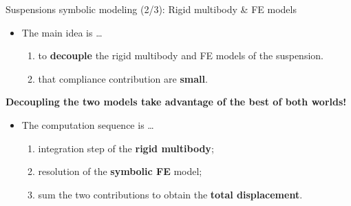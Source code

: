 \begin{frame}{Suspensions symbolic modeling (2/3): Rigid multibody \& FE models}
  \begin{minipage}[c]{0.55\linewidth}
    \begin{itemize}
      \item The main idea is \dots \\[0.5em]
      \begin{enumerate}
        \item to \textbf{decouple} the rigid multibody and FE models of the suspension. \\[0.5em]
        \item that compliance contribution are \textbf{small}. \\[1.0em]
      \end{enumerate}
    \end{itemize}
    \begin{center}\begin{minipage}{7.0cm}\begin{block}{}
      \centering
      \textcolor{mycolor1}{\textbf{Decoupling the two models take advantage of the best of both worlds!}}
    \end{block}\end{minipage}\vspace{1.0em}\end{center}
    \begin{itemize}
      \item The computation sequence is \dots \\[0.5em]
      \begin{enumerate}
        \item integration step of the \textbf{rigid multibody}; \\[0.5em]
        \item resolution of the \textbf{symbolic FE} model; \\[0.5em]
        \item sum the two contributions to obtain the \textbf{total displacement}. \\[1.0em]
      \end{enumerate}
    \end{itemize}
  \end{minipage}
  \begin{minipage}[c]{0.40\linewidth}
  \end{minipage}
\end{frame}

